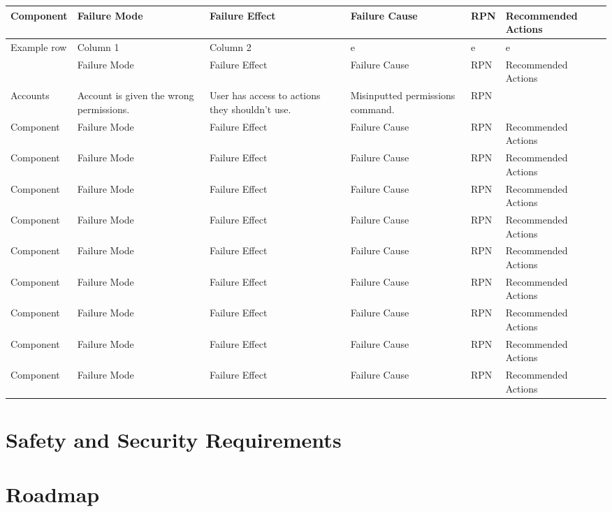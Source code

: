 \documentclass{article}
\begin{document}
\hspace*{-3.25cm}
\begin{tabularx}{504pt}{|p{2cm}||p{3cm}|p{3cm}|p{3cm}|p{1cm}|p{3cm}|}
\hline
\textbf{Component} & \textbf{Failure Mode} & \textbf{Failure Effect} & \textbf{Failure Cause} & \textbf{RPN} & \textbf{Recommended Actions}\\
\hline
\multirow{2}{*}{Example row} & Column 1 & Column 2 & e & e & e\\
Component & Failure Mode & Failure Effect & Failure Cause & RPN & Recommended Actions\\
\hline
Accounts & Account is given the wrong permissions. & User has access to
actions they shouldn't use. & Misinputted permissions command. & RPN & \\
\hline
Component & Failure Mode & Failure Effect & Failure Cause & RPN & Recommended Actions\\
\hline
Component & Failure Mode & Failure Effect & Failure Cause & RPN & Recommended Actions\\
\hline
Component & Failure Mode & Failure Effect & Failure Cause & RPN & Recommended Actions\\
\hline
Component & Failure Mode & Failure Effect & Failure Cause & RPN & Recommended Actions\\
\hline
Component & Failure Mode & Failure Effect & Failure Cause & RPN & Recommended Actions\\
\hline
Component & Failure Mode & Failure Effect & Failure Cause & RPN & Recommended Actions\\
\hline
Component & Failure Mode & Failure Effect & Failure Cause & RPN & Recommended Actions\\
\hline
Component & Failure Mode & Failure Effect & Failure Cause & RPN & Recommended Actions\\
\hline
Component & Failure Mode & Failure Effect & Failure Cause & RPN & Recommended Actions\\
\hline
\end{tabularx}



\section{Safety and Security Requirements}


\section{Roadmap}
\end{document}

